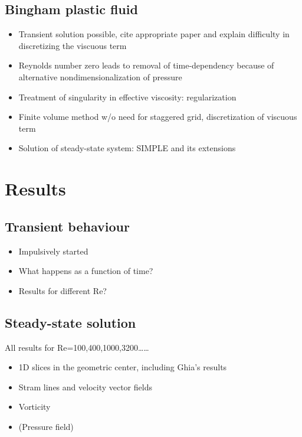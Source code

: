 \documentclass[final,3p,twocolumn]{elsarticle}
\begin{document}
\subsection{Bingham plastic fluid}
\label{subsec:bingham}

\begin{itemize}
    \item Transient solution possible, cite appropriate paper and explain
        difficulty in discretizing the viscuous term
    \item Reynolds number zero leads to removal of time-dependency because of
        alternative nondimensionalization of pressure 
    \item Treatment of singularity in effective viscosity: regularization
    \item Finite volume method w/o need for staggered grid, discretization of
        viscuous term
    \item Solution of steady-state system: SIMPLE and its extensions
\end{itemize}

\section{Results}
\label{sec:results}

\subsection{Transient behaviour}
\label{subsec:transient}

\begin{itemize}
    \item Impulsively started
    \item What happens as a function of time? 
    \item Results for different Re? 
\end{itemize}

\subsection{Steady-state solution}
\label{subsec:steady}

All results for Re=100,400,1000,3200\ldots\ldots

\begin{itemize}
    \item 1D slices in the geometric center, including Ghia's results
    \item Stram lines and velocity vector fields
    \item Vorticity 
    \item (Pressure field)
\end{itemize}
\end{document}
